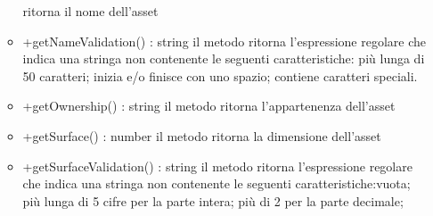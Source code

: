\begin{itemize}
\begin{itemize}
		ritorna il nome dell'asset
		\item +getNameValidation() : string\newline
		il metodo ritorna l'espressione regolare che indica una stringa non contenente le seguenti caratteristiche: più lunga di 50 caratteri; inizia e/o finisce con uno spazio; contiene caratteri speciali.
		\item +getOwnership() : string\newline
		il metodo ritorna l'appartenenza dell'asset
		\item +getSurface() : number\newline
		il metodo ritorna la dimensione dell'asset
		\item +getSurfaceValidation() : string\newline
		il metodo ritorna l'espressione regolare che indica una stringa non contenente le seguenti caratteristiche:vuota; più lunga di 5 cifre per la parte intera; più di 2 per la parte decimale;
		

\end{itemize}
\end{itemize}
